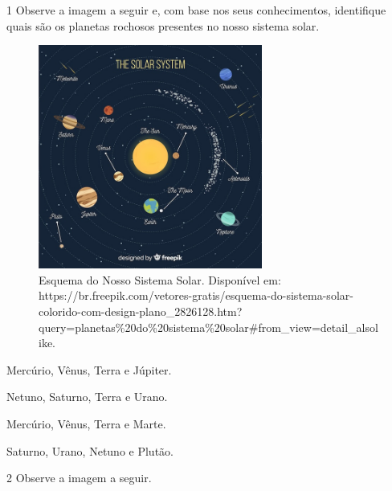 
\num{1} Observe a imagem a seguir e, com base nos seus conhecimentos, identifique quais são os planetas rochosos presentes no nosso sistema solar.

\begin{figure}[htpb!]
\includegraphics[width=2.89583in,height=2.89583in]{./imgs/img12.jpg}
\caption{Esquema do Nosso Sistema Solar. Disponível em:
https://br.freepik.com/vetores-gratis/esquema-do-sistema-solar-colorido-com-design-plano\_2826128.htm?query=planetas\%20do\%20sistema\%20solar\#from\_view=detail\_alsolike.}
\end{figure}

\begin{escolha}
\item
  Mercúrio, Vênus, Terra e Júpiter.
\item
  Netuno, Saturno, Terra e Urano.
\item
  Mercúrio, Vênus, Terra e Marte.
\item
  Saturno, Urano, Netuno e Plutão.
\end{escolha}


\num{2} Observe a imagem a seguir.

